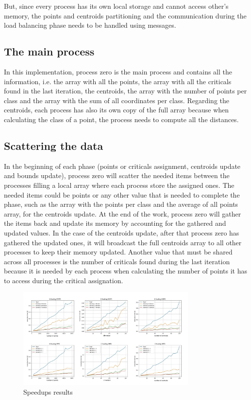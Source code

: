\documentclass[conference]{IEEEtran}
\begin{document}
But, since every process has its own local storage and cannot access other's memory, the points and centroids partitioning and the communication during the load balancing phase needs to be handled using messages. 

\subsection{The main process}
In this implementation, process zero is the main process and contains all the information, i.e. the array with all the points, the array with all the criticals found in the last iteration, the centroids, the array with the number of points per class and the array with the sum of all coordinates per class. Regarding the centroids, each process has also its own copy of the full array because when calculating the class of a point, the process needs to compute all the distances.

\subsection{Scattering the data}
In the beginning of each phase (points or criticals assignment, centroids update and bounds update), process zero will scatter the needed items between the processes filling a local array where each process store the assigned ones. The needed items could be points or any other value that is needed to complete the phase, such as the array with the points per class and the average of all points array, for the centroids update. At the end of the work, process zero will gather the items back and update its memory by accounting for the gathered and updated values. In the case of the centroids update, after that process zero has gathered the updated ones, it will broadcast the full centroids array to all other processes to keep their memory updated. Another value that must be shared across all processes is the number of criticals found during the last iteration because it is needed by each process when calculating the number of points it has to access during the critical assignation.

\begin{figure}
    \centering
    \caption{Speedups results}
    \label{fig:test_res}
    \includegraphics[width = 0.8\textwidth]{imgs/times.jpg}
\end{figure}
\end{document}

